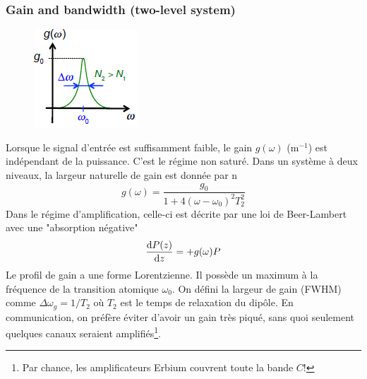 \subsubsection{Gain and bandwidth (two-level system)}
	\begin{figure}
	\vspace{-5mm}
	\includegraphics[scale=0.8]{ch6/image1}
	\end{figure}
Lorsque le signal d'entrée est suffisamment faible, le gain $g(\omega)$ (m$^{-1}$) est indépendant 
de la puissance. C'est le régime non saturé. Dans un système à deux niveaux, la largeur naturelle de
gain est donnée par n
\begin{equation}
g(\omega ) = \frac{{{g_0}}}{{1 + 4{{(\omega  - {\omega _0})}^2}T_2^2}}
\end{equation}
Dans le régime d'amplification, celle-ci est décrite par une loi de Beer-Lambert avec une "absorption
négative"
\begin{equation}
\frac{{{\rm{d}}P(z)}}{{{\rm{d}}z}} =  + g(\omega )P
\end{equation}
Le profil de gain a une forme Lorentzienne. Il possède un maximum à la fréquence de la transition 
atomique $\omega_0$. On défini la largeur de gain (FWHM) comme $\Delta\omega_g = 1/T_2$ où $T_2$
est le temps de relaxation du dipôle. En communication, on préfère éviter d'avoir un gain très 
piqué, sans quoi seulement quelques canaux seraient amplifiés\footnote{Par chance, les amplificateurs
Erbium couvrent toute la bande $C$!}.

